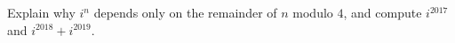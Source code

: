 Explain why $i^n$ depends only on the remainder of $n$ modulo $4$, and compute $i^{2017}$ and $i^{2018}+i^{2019}$.
